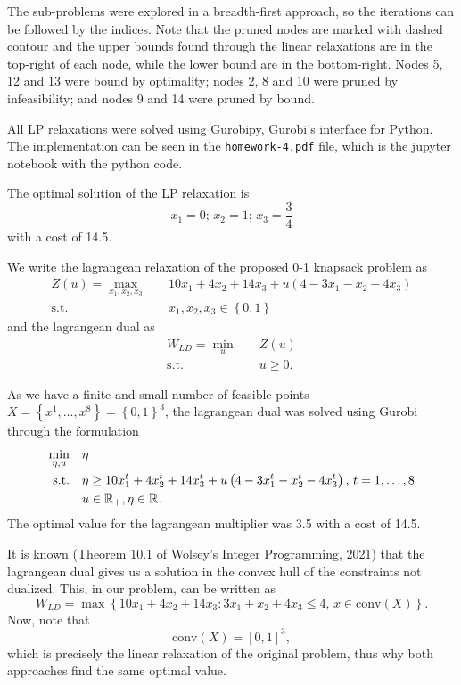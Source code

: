 \documentclass[a4paper]{report}
\begin{document}
The sub-problems were explored in a breadth-first approach, so the iterations can be followed by the indices. Note that the pruned nodes are marked with dashed contour and the upper bounds found through the linear relaxations are in the top-right of each node, while the lower bound are in the bottom-right. Nodes 5, 12 and 13 were bound by optimality; nodes 2, 8 and 10 were pruned by infeasibility; and nodes 9 and 14 were pruned by bound.

All LP relaxations were solved using Gurobipy, Gurobi's interface for Python. The implementation can be seen in the \texttt{homework-4.pdf} file, which is the jupyter notebook with the python code.


The optimal solution of the LP relaxation is \[
x_1 = 0;\, x_2=1;\, x_3=\frac{3}{4}
\] with a cost of 14.5.

We write the lagrangean relaxation of the proposed 0-1 knapsack problem as
\begin{align*}
    Z(u) = \max_{x_1,x_2,x_3} \quad & 10x_1+4x_2+14x_3 + u\left( 4-3x_1-x_2-4x_3 \right)  \\
    \textrm{s.t.} \quad & x_1,x_2,x_3\in \left\{ 0,1 \right\}
\end{align*}
and the lagrangean dual as
\begin{align*}
    W_{LD} = \min_{u} \quad & Z(u) \\
    \textrm{s.t.} \quad & u\ge 0
.\end{align*}

As we have a finite and small number of feasible points $X=\left\{ x^{1},\ldots,x^{8} \right\} = \left\{ 0,1 \right\}^{3}$, the lagrangean dual was solved using Gurobi through the formulation
\begin{align*}
    \min_{\eta,u} \quad & \eta \\
    \textrm{s.t.} \quad & \eta \ge 10x_1^{t}+4x_2^{t}+14x_3^{t} + u\left( 4-3x_1^{t}-x_2^{t}-4x_3^{t} \right),\, t=1,\ldots,8  \\
      & u\in \mathbb{R}_+,\eta\in \mathbb{R}
.\end{align*}
The optimal value for the lagrangean multiplier was 3.5 with a cost of 14.5.

It is known (Theorem 10.1 of Wolsey's Integer Programming, 2021) that the lagrangean dual gives us a solution in the convex hull of the constraints not dualized. This, in our problem, can be written as \[
W_{LD} = \max\left\{ 10x_1+4x_2+14x_3 : 3x_1+x_2+4x_3\le 4,\, x\in \text{conv}\left( X \right)  \right\} 
.\] Now, note that \[
\text{conv}\left( X \right) = \left[ 0,1 \right] ^{3}
,\] which is precisely the linear relaxation of the original problem, thus why both approaches find the same optimal value.
\end{document}
